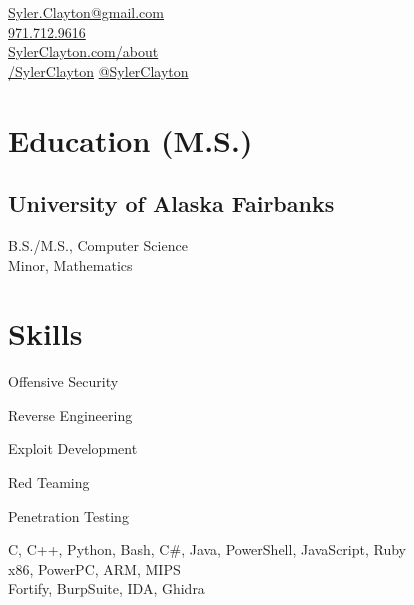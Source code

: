 \documentclass[]{hieudo-build}
\begin{document}
	
	{
		\faEnvelope\href{mailto:syler.clayton@gmail.com}{ Syler.Clayton@gmail.com}\\
		\faPhone \href{tel:+19717129616}{971.712.9616}
		\\
		\faGlobe\href{http://sylerclayton.com/about}{ SylerClayton.com/about}\\
		\faLinkedin\href{https://www.linkedin.com/in/sylerclayton}{ /SylerClayton}
		\faTwitter\href{https://twitter.com/sylerclayton}{@SylerClayton}
	}
	
	\begin{minipage}[t]{0.34\textwidth} 
		
		\section{Education (M.S.)} 
		
		\subsection{University of Alaska Fairbanks}
		B.S./M.S., Computer Science \\
		Minor, Mathematics
		
		\section{Skills}
		\begin{tightemize}
		\item Offensive Security
		\item Reverse Engineering
		\item Exploit Development
		\item Red Teaming
		\item Penetration Testing
		\end{tightemize}
		C, C++, Python, Bash, C\#, Java, PowerShell, JavaScript, Ruby \\ 
		x86, PowerPC, ARM, MIPS\\
		Fortify, BurpSuite, IDA, Ghidra

\end{minipage}
\end{document}
